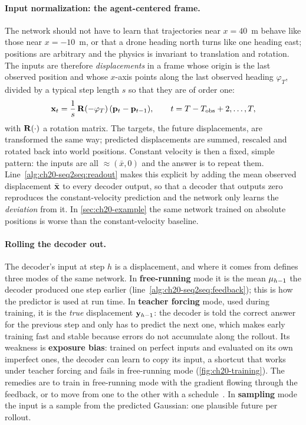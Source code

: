 \paragraph{Input normalization: the agent-centered frame.}
%
The network should not have to learn that trajectories near $x = 40$~m
behave like those near $x = -10$~m, or that a drone heading north turns like
one heading east; positions are arbitrary and the physics is invariant to
translation and rotation. The inputs are therefore \emph{displacements} in a
frame whose origin is the last observed position and whose $x$-axis points
along the last observed heading $\varphi_T$, divided by a typical step length
$s$ so that they are of order one:
\begin{equation}
  \mathbf{x}_t = \frac{1}{s}\,\mathbf{R}(-\varphi_T)\,(\mathbf{p}_t - \mathbf{p}_{t-1}),
  \qquad t = T - T_{\mathrm{obs}} + 2, \dots, T,
  \label{eq:ch20-frame}
\end{equation}
with $\mathbf{R}(\cdot)$ a rotation matrix. The targets, the future
displacements, are transformed the same way; predicted displacements are
summed, rescaled and rotated back into world positions. Constant velocity is
then a fixed, simple pattern: the inputs are all $\approx (\bar{x}, 0)$ and
the answer is to repeat them. Line~\ref{alg:ch20-seq2seq:readout} makes this
explicit by adding the mean observed displacement $\bar{\mathbf{x}}$ to every
decoder output, so that a decoder that outputs zero reproduces the
constant-velocity prediction and the network only learns the
\emph{deviation} from it. In \cref{sec:ch20-example} the same network trained
on absolute positions is worse than the constant-velocity baseline.

\paragraph{Rolling the decoder out.}
The decoder's input at step $h$ is a displacement, and where it comes from
defines three modes of the same network. In \textbf{free-running} mode it is
the mean $\mathbf{\mu}_{h-1}$ the decoder produced one step earlier
(line~\ref{alg:ch20-seq2seq:feedback}); this is how the predictor is used at
run time. In \textbf{teacher forcing} mode, used during
training, it is the \emph{true} displacement $\mathbf{y}_{h-1}$: the decoder is
told the correct answer for the previous step and only has to predict the
next one, which makes early training fast and stable because errors do not
accumulate along the rollout. Its weakness is \textbf{exposure
bias}: trained on perfect inputs and evaluated on its
own imperfect ones, the decoder can learn to copy its input, a shortcut that
works under teacher forcing and fails in free-running mode
(\cref{fig:ch20-training}). The remedies are to train in free-running mode
with the gradient flowing through the feedback, or to move from one to the
other with a schedule~\cite{bengio2015scheduled}. In \textbf{sampling} mode
the input is a sample from the predicted Gaussian: one plausible future per
rollout.

